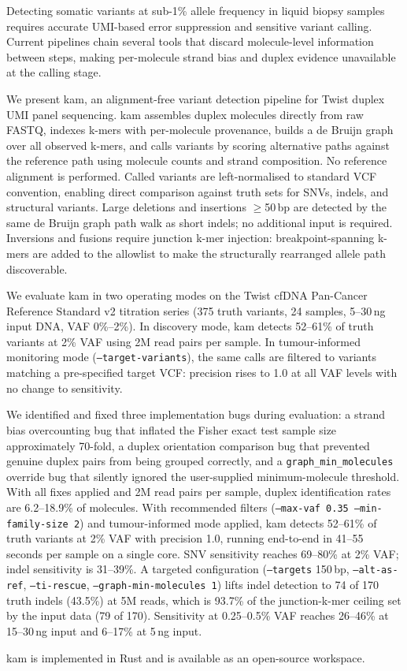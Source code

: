 Detecting somatic variants at sub-1\% allele frequency in liquid biopsy samples
requires accurate UMI-based error suppression and sensitive variant calling.
Current pipelines chain several tools that discard molecule-level information
between steps, making per-molecule strand bias and duplex evidence unavailable
at the calling stage.

We present kam, an alignment-free variant detection pipeline for Twist duplex
UMI panel sequencing. kam assembles duplex molecules directly from raw FASTQ,
indexes k-mers with per-molecule provenance, builds a de Bruijn graph over all
observed k-mers, and calls variants by scoring alternative paths against the
reference path using molecule counts and strand composition. No reference
alignment is performed. Called variants are left-normalised to standard VCF
convention, enabling direct comparison against truth sets for SNVs, indels, and
structural variants. Large deletions and insertions $\ge$50\,bp are detected by the same de Bruijn graph path walk as short indels; no additional input is required. Inversions and fusions require junction k-mer injection: breakpoint-spanning k-mers are added to the allowlist to make the structurally rearranged allele path discoverable.

We evaluate kam in two operating modes on the Twist cfDNA Pan-Cancer Reference
Standard v2 titration series (375 truth variants, 24 samples, 5--30\,ng input
DNA, VAF 0\%--2\%). In discovery mode, kam detects 52--61\% of truth variants
at 2\% VAF using 2M read pairs per sample. In tumour-informed monitoring mode
(\texttt{--target-variants}), the same calls are filtered to variants matching
a pre-specified target VCF: precision rises to 1.0 at all VAF levels with no
change to sensitivity.

We identified and fixed three implementation bugs during evaluation: a strand
bias overcounting bug that inflated the Fisher exact test sample size
approximately 70-fold, a duplex orientation comparison bug that prevented
genuine duplex pairs from being grouped correctly, and a \texttt{graph\_min\_molecules}
override bug that silently ignored the user-supplied minimum-molecule threshold.
With all fixes applied and 2M read pairs per sample, duplex identification
rates are 6.2--18.9\% of molecules. With recommended filters
(\texttt{--max-vaf 0.35 --min-family-size 2}) and tumour-informed mode applied,
kam detects 52--61\% of truth variants at 2\% VAF with precision 1.0, running
end-to-end in 41--55 seconds per sample on a single core. SNV sensitivity
reaches 69--80\% at 2\% VAF; indel sensitivity is 31--39\%. A targeted
configuration (\texttt{--targets} 150\,bp, \texttt{--alt-as-ref},
\texttt{--ti-rescue}, \texttt{--graph-min-molecules 1}) lifts indel detection
to 74 of 170 truth indels (43.5\%) at 5M reads, which is 93.7\% of the
junction-k-mer ceiling set by the input data (79 of 170).
Sensitivity at 0.25--0.5\% VAF reaches 26--46\% at 15--30\,ng input and
6--17\% at 5\,ng input.

kam is implemented in Rust and is available as an open-source workspace.
